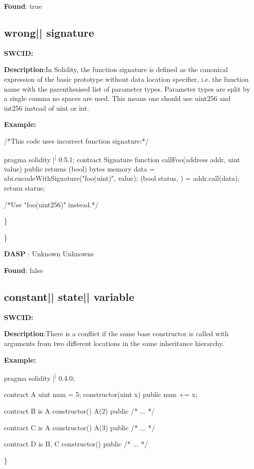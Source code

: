 \documentclass{article}
\begin{document}
\textbf{Found}: true

\subsection{wrong{|\textunderscore| }signature} 
\textbf{SWC{\textunderscore }ID:} 

\textbf{Description}:In Solidity, the function signature is defined as the canonical expression of the basic prototype without data location specifier, i.e. the function name with the parenthesised list of parameter types. Parameter types are split by a single comma {\textendash} no spaces are used. This means one should use uint256 and int256 instead of uint or int.


\textbf{Example:} 
\begin{ffcode} 

 /*This code uses incorrect function signature:*/ 

pragma solidity |\textsuperscript| 0.5.1;
contract Signature {
    function callFoo(address addr, uint value) public returns (bool) {
        bytes memory data = abi.encodeWithSignature("foo(uint)", value);
        (bool status, ) = addr.call(data);
        return status;
    }
}

/*Use "foo(uint256)" instead.*/

\end{ffcode} 
\} 

\} 

\textbf{DASP} : Unknown Unknowns

\textbf{Found}: false

\subsection{constant{|\textunderscore| }state{|\textunderscore| }variable} 
\textbf{SWC{\textunderscore }ID:} 

\textbf{Description}:There is a conflict if the same base constructor is called with arguments from two different locations in the same inheritance hierarchy.


\textbf{Example:} 
\begin{ffcode} 

pragma solidity |\textsuperscript| 0.4.0;

contract A{
    uint num = 5;
    constructor(uint x) public{
        num += x;
    }
}

contract B is A{
    constructor() A(2) public { /* ... */ }
}

contract C is A {
    constructor() A(3) public { /* ... */ }
}

contract D is B, C {
    constructor() public { /* ... */ }
}

\end{ffcode} 
\} 
\end{document}
